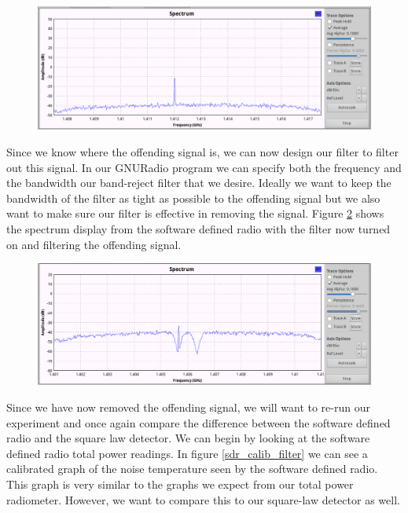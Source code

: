 \begin{figure}[h!tb] \centering

\includegraphics[width=\textwidth]{Images/spectrum_interference.png}

\label{spectrum_interfering}
\end{figure}

Since we know where the offending signal is, we can now design our filter to filter out this signal.  In our GNURadio program we can specify both the frequency and the bandwidth our band-reject filter that we desire.  Ideally we want to keep the bandwidth of the filter as tight as possible to the offending signal but we also want to make sure our filter is effective in removing the signal.  Figure \ref{spectrum_filter} shows the spectrum display from the software defined radio with the filter now turned on and filtering the offending signal.

\begin{figure}[h!tb] \centering

\includegraphics[width=\textwidth]{Images/spectrum_filter.png}

\label{spectrum_filter}
\end{figure}

Since we have now removed the offending signal, we will want to re-run our experiment and once again compare the difference between the software defined radio and the square law detector. We can begin by looking at the software defined radio total power readings.  In figure \ref{sdr_calib_filter} we can see a calibrated graph of the noise temperature seen by the software defined radio.  This graph is very similar to the graphs we expect from our total power radiometer.  However, we want to compare this to our square-law detector as well.  

